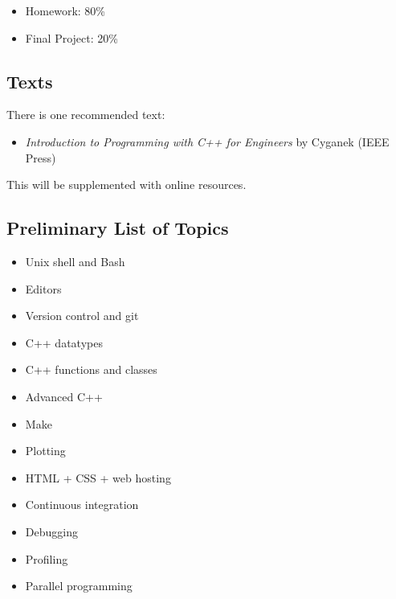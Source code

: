 \documentclass[10pt]{article}
\newenvironment{itemsquish}
  { \begin{itemize}
    \addtolength{\itemsep}{-0.25\baselineskip}
    \addtolength{\baselineskip}{-0.25\baselineskip} }
  { \end{itemize} }
\begin{document}
\begin{itemsquish}
\item Homework: 80\%
\item Final Project: 20\%
\end{itemsquish}


\subsection*{Texts}

\noindent There is one recommended text:

\begin{itemize}
\item {\em Introduction to Programming with C++ for Engineers} by Cyganek (IEEE Press)
\end{itemize}

This will be supplemented with online resources.


\subsection*{ Preliminary List of Topics}

\begin{itemize}

\item Unix shell and Bash

\item Editors

\item Version control and git

\item C++ datatypes

\item C++ functions and classes

\item Advanced C++

\item Make

\item Plotting

\item HTML + CSS + web hosting

\item Continuous integration

\item Debugging

\item Profiling

\item Parallel programming

\end{itemize}
\end{document}
